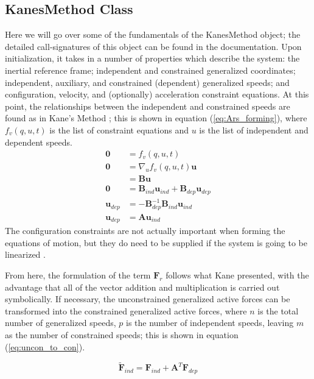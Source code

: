 \documentclass[twocolumn,10pt]{asme2e}
\begin{document}
\subsection*{KanesMethod Class}
Here we will go over some of the fundamentals of the KanesMethod object; the
detailed call-signatures of this object can be found in the documentation.
Upon initialization, it takes in a number of properties which describe the
system: the inertial reference frame; independent and constrained generalized
coordinates; independent, auxiliary, and constrained (dependent) generalized
speeds; and configuration, velocity, and (optionally) acceleration constraint
equations. At this point, the relationships between the independent and
constrained speeds are found as in Kane's Method \cite{Kane1985}; this is shown
in equation (\ref{eq:Ars_forming}), where $f_v(q, u, t)$ is the list of
constraint equations and $u$ is the list of independent and dependent speeds.
\begin{align}
\mathbf{0} &= f_v(q, u, t) \\
\mathbf{0} &= \nabla_u f_v(q, u, t) \mathbf{u} \\
           &= \mathbf{B} \mathbf{u} \\
\mathbf{0} &= \mathbf{B}_{ind} \mathbf{u}_{ind} + \mathbf{B}_{dep}
\mathbf{u}_{dep} \\
\mathbf{u}_{dep} &= - \mathbf{B}_{dep}^{-1} \mathbf{B}_{ind} \mathbf{u}_{ind} \\
\mathbf{u}_{dep} &= \mathbf{A} \mathbf{u}_{ind}
\label{eq:Ars_forming}
\end{align}
The configuration constraints are not actually important when forming the
equations of motion, but they do need to be supplied if the system is going to
be linearized \cite{Peterson2013}.

From here, the formulation of the term $\mathbf{F}_r$ follows what Kane
presented, with the advantage that all of the vector addition and
multiplication is carried out symbolically.
If necessary, the unconstrained generalized active forces can be transformed
into the constrained generalized active forces, where $n$ is the total number of
generalized speeds, $p$ is the number of independent speeds, leaving $m$ as the
number of constrained speeds; this is shown in equation (\ref{eq:uncon_to_con}).

\begin{equation}
\label{eq:uncon_to_con}
\tilde{\mathbf{F}}_{ind} = \mathbf{F}_{ind} + \mathbf{A}^{T}
\mathbf{F}_{dep}
\end{equation}
\end{document}
